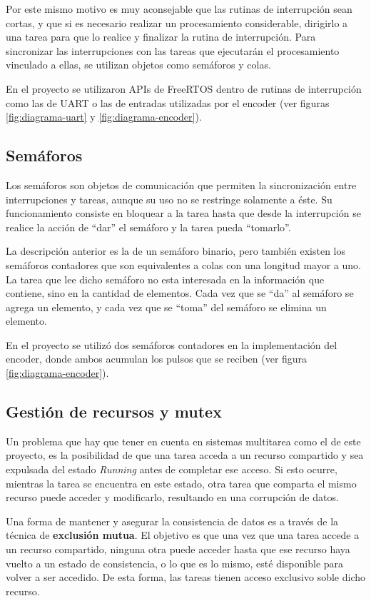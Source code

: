 \documentclass{IEEEtran}
\begin{document}
Por este mismo motivo es muy aconsejable que las rutinas de interrupción sean cortas, y que si es necesario realizar un procesamiento considerable, dirigirlo a una tarea para que lo realice y finalizar la rutina de interrupción. Para sincronizar las interrupciones con las tareas que ejecutarán el procesamiento vinculado a ellas, se utilizan objetos como semáforos y colas.

En el proyecto se utilizaron APIs de FreeRTOS dentro de rutinas de interrupción como las de UART o las de entradas utilizadas por el encoder (ver figuras \ref{fig:diagrama-uart} y \ref{fig:diagrama-encoder}).

\subsection{Semáforos}
Los semáforos son objetos de comunicación que permiten la sincronización entre interrupciones y tareas, aunque su uso no se restringe solamente a éste. Su funcionamiento consiste en bloquear a la tarea hasta que desde la interrupción se realice la acción de ``dar'' el semáforo y la tarea pueda ``tomarlo''.

La descripción anterior es la de un semáforo binario, pero también existen los semáforos contadores que son equivalentes a colas con una longitud mayor a uno. La tarea que lee dicho semáforo no esta interesada en la información que contiene, sino en la cantidad de elementos. Cada vez que se ``da'' al semáforo se agrega un elemento, y cada vez que se ``toma'' del semáforo se elimina un elemento.

En el proyecto se utilizó dos semáforos contadores en la implementación del encoder, donde ambos acumulan los pulsos que se reciben (ver figura \ref{fig:diagrama-encoder}).

\subsection{Gestión de recursos y mutex}
Un problema que hay que tener en cuenta en sistemas multitarea como el de este proyecto, es la posibilidad de que una tarea acceda a un recurso compartido y sea expulsada del estado \textit{Running} antes de completar ese acceso. Si esto ocurre, mientras la tarea se encuentra en este estado, otra tarea que comparta el mismo recurso puede acceder y modificarlo, resultando en una corrupción de datos.

Una forma de mantener y asegurar la consistencia de datos es a través de la técnica de \textbf{exclusión mutua}. El objetivo es que una vez que una tarea accede a un recurso compartido, ninguna otra puede acceder hasta que ese recurso haya vuelto a un estado de consistencia, o lo que es lo mismo, esté disponible para volver a ser accedido. De esta forma, las tareas tienen acceso exclusivo soble dicho recurso.
\end{document}
